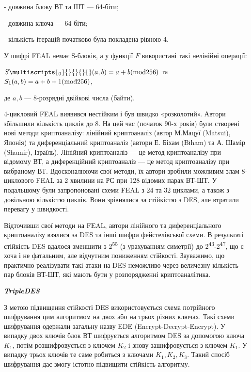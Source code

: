 {}- довжина блоку ВТ та ШТ --- 64-біти; 

{}- довжина ключа --- 64 біти;

{}- кількість ітерацій початково була покладена рівною 4.

У шифрі FEAL немає S-блоків, а у функції  $F$ використані такі нелінійні
операції:


$S\multiscripts{_{0}}{}{}{\text{}}{}(a,b)=a+b(\text{mod}\text256)$\textit{
 }та   $S_{1}(a,b)=a+b+1(\text{mod}\text256)$,

де  $a,b$ --- 8-розрядні двійкові числа (байти).

4-цикловий FEAL виявився нестійким і був швидко «розколотий». Автори збільшили
кількість циклів до 8. На цей час (початок 90-х років) були створені нові
методи криптоаналізу: лінійний криптоаналіз (автор М.Мацуї (Matsui), Японія) та
диференціальний криптоаналіз (автори Е. Біхам (Biham) та А. Шамір (Shamir),
Ізраїль). Лінійний криптоаналіз --- це метод криптоаналізу при відомому ВТ, а
диференційний криптоаналіз --- це метод криптоаналізу при вибраному ВТ.
Вдосконалюючи свої методи, їх автори зробили можливим злам  8-циклового  FEAL
за 2 хвилини на РС при 128 відомих парах ВТ-ШТ. У подальшому були запропоновані
схеми FEAL з 24 та 32 циклами, а також з довільною кількістю циклів. Вони
зрівнялися за стійкістю з DES, але втратили  перевагу у швидкості.

Відточивши свої методи на FEAL, автори  лінійного та диференціального
криптоаналізу взялися за DES та інші шифри фейстелівської схеми. В результаті
стійкість DES вдалося зменшити з 2\textsuperscript{55} (з урахуванням симетрії)
до 2\textsuperscript{43}{}-2\textsuperscript{47}, що є хоча і не фатальним, але
відчутним пониженням стійкості. Зауважимо,  що практично реалізувати такі атаки
на DES неможливо через величезну кількість пар блоків ВТ-ШТ, які мають бути у
розпорядженні криптоаналітика.


\bigskip


\bigskip

{\centering\bfseries\itshape
TripleDES 
\par}


\bigskip

З метою підвищення стійкості DES використовується схема потрійного шифрування
цим алгоритмом на двох або на трьох різних ключах. Такі схеми шифрування
одержали загальну назву EDE (Encrypt{}-Decrypt{}-Encrypt). У випадку двох
ключів блок ВТ шифрується алгоритмом DES за допомогою ключа  $K_1$, потім
розшифровується  з ключем $K_2$ і  знову зашифровується з ключем 
$K_1$.  У випадку трьох ключів те саме робиться з ключами 
$K_{1},K_{2},K_3$. Такий спосіб шифрування дає змогу істотно
підвищити стійкість алгоритму.


